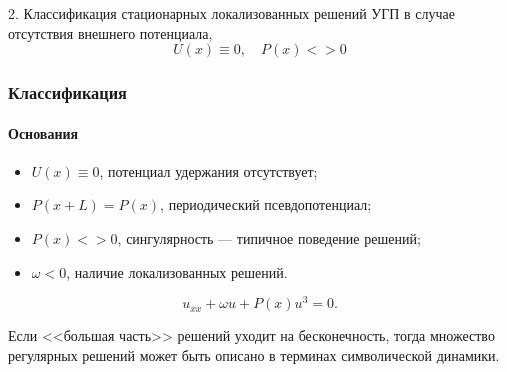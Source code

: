 \documentclass [10pt] {beamer}
\begin{document}

\begin{frame}
	\begin{center}
		{\LARGE 2. Классификация стационарных локализованных решений УГП в случае отсутствия внешнего потенциала, $$U(x) \equiv 0, \quad P(x) <> 0$$}
	\end{center}
\end{frame}

\begin{frame}
	\frametitle{Классификация}
	\framesubtitle{Основания}
	
	\begin{itemize}
		\item $U(x) \equiv 0$, потенциал удержания отсутствует;
		\item $P(x + L) = P(x)$, периодический псевдопотенциал;
		\item $P(x) <> 0$, сингулярность --- типичное поведение решений;
		\item $\omega < 0$, наличие локализованных решений.
	\end{itemize}
	
	\begin{equation}
		u_{xx} + \omega u + P(x) u^3 = 0.
		\label{eq:classification}
	\end{equation}
	
	\medskip
	
	Если <<большая часть>> решений уходит на бесконечность, тогда множество регулярных решений может быть описано в терминах символической динамики\footnotemark[3].
	
\end{frame}
\end{document}
